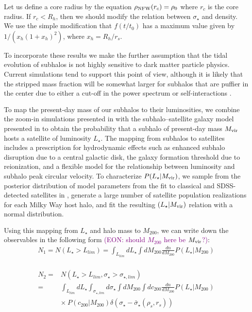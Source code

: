 \documentclass[modern,linenumbers]{aastex62}
\newcommand{\Comment}[3]{\textcolor{#1}{(#2: #3)}}
\newcommand{\EON}[1]{\Comment{purple}{EON}{#1}} %
\begin{document}
Let us define a core radius by the equation $\rho_{\rm NFW}(r_c) = \rho_0$ where $r_c$ is the core radius. If $r_c < R_h$, then we should modify the relation between $\sigma_\star$ and density. We use the simple modification that $f(t/t_0)$ has a maximum value given by $1/(x_h(1+x_h)^2)$, where $x_h = R_h/r_s$. 

To incorporate these results we make the further assumption that the tidal evolution of subhalos is not highly sensitive to dark matter particle physics. Current simulations tend to support this point of view, although it is likely that the stripped mass fraction will be somewhat larger for subhalos that are puffier in the center due to either a cut-off in the power spectrum or self-interactions \citep{Lovell:2013ola,Dooley:2016ajo}. 

To map the present-day mass of our subhalos to their luminosities, we combine the zoom-in simulations presented in \cite{Mao2015} with the subhalo--satellite galaxy model presented in \cite{Nadler:2018} to obtain the probability that a subhalo of present-day mass $M_{\rm{vir}}$ hosts a satellite of luminosity $L_\star$. The mapping from subhalos to satellites includes a prescription for hydrodynamic effects such as enhanced subhalo disruption due to a central galactic disk, the galaxy formation threshold due to reionization, and a flexible model for the relationship between luminosity and subhalo peak circular velocity. To characterize $P(L_\star|M_{\rm{vir}})$, we sample from the posterior distribution of model parameters from the fit to classical and SDSS-detected satellites in \cite{Nadler:2018}, generate a large number of satellite population realizations for each Milky Way host halo, and fit the resulting $(L_\star|M_{\rm{vir}})$ relation with a normal distribution.

Using this mapping from $L_\star$ and halo mass to $M_{200}$, we can write down the observables in the following form \EON{should $M_{200}$ here be $M_{\rm{vir}}$?}:
\begin{equation}
    \begin{aligned}
    N_1 = N(L_\star>L_{lim})= \int_{L_{lim}} dL_\star \int dM_{200} \frac{dn}{d M_{200}} P(L_\star|M_{200}) \\
    \end{aligned}
\end{equation}

\begin{equation}
    \begin{aligned}
N_2 =& N(L_\star>L_{lim}, \sigma_\star> \sigma_{\star,lim}) \\ 
    =& \int_{L_{lim}} dL_\star \int_{\sigma_{\star,lim}} d\sigma_\star \int dM_{200} \int dc_{200} \frac{dn}{d M_{200}} P(L_\star|M_{200})\\
    & \times\ P(c_{200}|M_{200}) \delta(\sigma_\star-\bar{\sigma}_\star(\rho_s,r_s))
    \end{aligned}
\end{equation}
\end{document}
